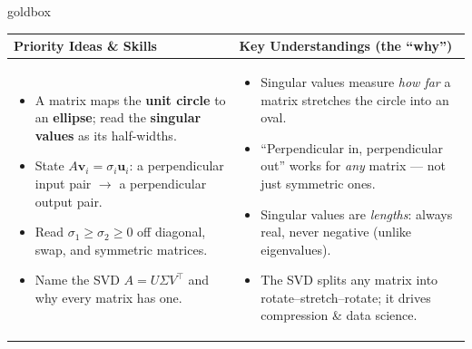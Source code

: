 \documentclass[10pt]{article}
\newcommand{\uu}{\mathbf{u}}
\newcommand{\vv}{\mathbf{v}}
\newcommand{\T}{^{\top}}
\begin{document}
\renewcommand{\arraystretch}{1.4}
\begin{skillbox}{goldbox}
\begin{tabularx}{\linewidth}{@{}X|X@{}}
\textbf{Priority Ideas \& Skills} & \textbf{Key Understandings (the ``why'')} \\[2pt]
\hline
\vspace{-6pt}
\begin{itemize}[leftmargin=1.1em, nosep, after=\vspace{2pt}]
  \item A matrix maps the \textbf{unit circle} to an \textbf{ellipse}; read the \textbf{singular values} as its half-widths.
  \item State $A\vv_i=\sigma_i\uu_i$: a perpendicular input pair $\to$ a perpendicular output pair.
  \item Read $\sigma_1\ge\sigma_2\ge0$ off diagonal, swap, and symmetric matrices.
  \item Name the SVD $A=U\Sigma V\T$ and why every matrix has one.
\end{itemize}
&
\vspace{-6pt}
\begin{itemize}[leftmargin=1.1em, nosep, after=\vspace{2pt}]
  \item Singular values measure \emph{how far} a matrix stretches the circle into an oval.
  \item ``Perpendicular in, perpendicular out'' works for \emph{any} matrix --- not just symmetric ones.
  \item Singular values are \emph{lengths}: always real, never negative (unlike eigenvalues).
  \item The SVD splits any matrix into rotate--stretch--rotate; it drives compression \& data science.
\end{itemize}
\end{tabularx}
\end{skillbox}
\end{document}
